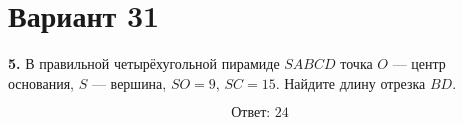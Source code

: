 \documentclass[12pt,a4paper]{article}
\begin{document}
\section*{Вариант 31}

\textbf{5.} В правильной четырёхугольной пирамиде \(SABCD\)
точка \(O\) --- центр основания, \(S\) --- вершина,
\(SO=9\), \(SC=15\). Найдите длину отрезка \(BD\).

\begin{center}
\end{center}

\[
\boxed{\text{Ответ: }24}
\]
\end{document}
